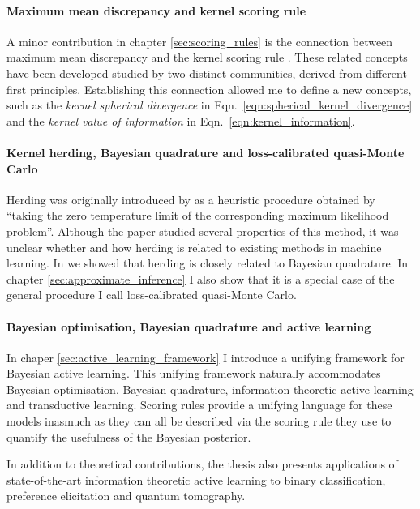 \paragraph{Maximum mean discrepancy and kernel scoring rule} A minor contribution in chapter \ref{sec:scoring_rules} is the connection between maximum mean discrepancy \citep{Gretton2012} and the kernel scoring rule \citep{Jose2008}. These related concepts have been developed studied by two distinct communities, derived from different first principles. Establishing this connection allowed me to define a new concepts, such as the \emph{kernel spherical divergence} in Eqn.\ \eqref{eqn:spherical_kernel_divergence} and the \emph{kernel value of information} in Eqn.\ \eqref{eqn:kernel_information}.

\paragraph{Kernel herding, Bayesian quadrature and loss-calibrated quasi-Monte Carlo} Herding was originally introduced by \citet{welling2009herding} as a heuristic procedure obtained by ``taking the zero temperature limit of the corresponding maximum likelihood problem''. Although the paper studied several properties of this method, it was unclear whether and how herding is related to existing methods in machine learning. In \citep{Huszar2012herding} we showed that herding is closely related to Bayesian quadrature. In chapter \ref{sec:approximate_inference} I also show that it is a special case of the general procedure I call loss-calibrated quasi-Monte Carlo.

\paragraph{Bayesian optimisation, Bayesian quadrature and active learning} In chaper \ref{sec:active_learning_framework} I introduce a unifying framework for Bayesian active learning. This unifying framework naturally accommodates Bayesian optimisation, Bayesian quadrature, information theoretic active learning and transductive learning. Scoring rules provide a unifying language for these models inasmuch as they can all be described via the scoring rule they use to quantify the usefulness of the Bayesian posterior.

In addition to theoretical contributions, the thesis also presents applications of state-of-the-art information theoretic active learning to binary classification, preference elicitation and quantum tomography.